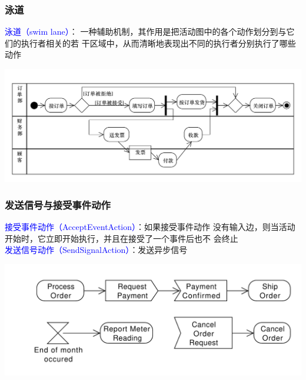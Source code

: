\documentclass[compress]{beamer}
\begin{document}
\begin{frame}
  \frametitle{泳道}
  \textcolor{blue}{泳道（swim lane）}：
  一种辅助机制，其作用是把活动图中的各个动作划分到与它们的执行者相关的若
  干区域中，从而清晰地表现出不同的执行者分别执行了哪些动作 \\[2ex] 

  \begin{center}
    \centering\includegraphics[width=1.0\hsize]{case1-lane.pdf}
  \end{center}
\end{frame}

\begin{frame}
  \frametitle{发送信号与接受事件动作}
  \textcolor{blue}{接受事件动作（AcceptEventAction）}：如果接受事件动作
  没有输入边，则当活动开始时，它立即开始执行，并且在接受了一个事件后也不
  会终止 \\
  \textcolor{blue}{发送信号动作（SendSignalAction）}：发送异步信号 \\

  \begin{center}
    \centering\includegraphics[width=1.0\hsize]{signal.pdf}
  \end{center}

\end{frame}
  
\end{document}
